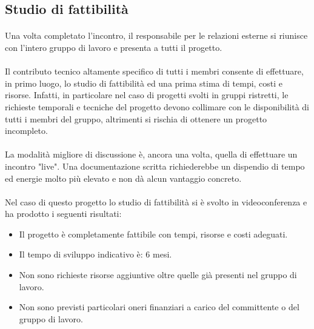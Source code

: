 \documentclass[11pt,a4paper,english]{article}
\begin{document}
\subsection{Studio di fattibilità}

\paragraph{} Una volta completato l'incontro, il responsabile per le relazioni esterne si riunisce con l'intero gruppo di lavoro e presenta a tutti il progetto. 

\paragraph{} Il contributo tecnico altamente specifico di tutti i membri consente di effettuare, in primo luogo, lo studio di fattibilità ed una prima stima di tempi, costi e risorse. Infatti, in particolare nel caso di progetti svolti in gruppi ristretti, le richieste temporali e tecniche del progetto devono collimare con le disponibilità di tutti i membri del gruppo, altrimenti si rischia di ottenere un progetto incompleto.

\paragraph{} La modalità migliore di discussione è, ancora una volta, quella di effettuare un incontro "live". Una documentazione scritta richiederebbe un dispendio di tempo ed energie molto più elevato e non dà alcun vantaggio concreto. 

\paragraph{} Nel caso di questo progetto lo studio di fattibilità si è svolto in videoconferenza e ha prodotto i seguenti risultati:
\begin{itemize}
    \item Il progetto è completamente fattibile con tempi, risorse e costi adeguati.
    \item Il tempo di sviluppo indicativo è: 6 mesi.
    \item Non sono richieste risorse aggiuntive oltre quelle già presenti nel gruppo di lavoro.
    \item Non sono previsti particolari oneri finanziari a carico del committente o del gruppo di lavoro.
\end{itemize}
\end{document}

